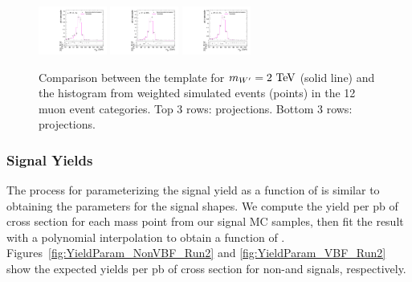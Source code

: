 \begin{figure}[htpb]
  \includegraphics[width=0.2\textwidth]{fig/2Dfit/templateVsReco_VBFWprToWZ2000_r0_MJ_mu_LP_vbf_LDy.pdf}
  \includegraphics[width=0.2\textwidth]{fig/2Dfit/templateVsReco_VBFWprToWZ2000_r0_MJ_mu_HP_vbf_HDy.pdf}
  \includegraphics[width=0.2\textwidth]{fig/2Dfit/templateVsReco_VBFWprToWZ2000_r0_MJ_mu_LP_vbf_HDy.pdf}\\
  \caption{
    Comparison between the \VBF\WprtoWZ template for $m_{\Wpr}=2\unit{TeV}$ (solid line) and the histogram from weighted simulated events (points) in the 12 muon event categories.
    Top 3 rows: \MVV projections.
    Bottom 3 rows: \MJ projections.
  }
  \label{fig:1dtemplateVsReco_VBFWprToWZ2000_Run2}
\end{figure}

\subsubsection{Signal Yields}

The process for parameterizing the signal yield as a function of \MX is similar to obtaining the parameters for the signal shapes.
We compute the yield per pb of cross section for each mass point from our signal MC samples, then fit the result with a polynomial interpolation to obtain a function of \MX.
Figures~\ref{fig:YieldParam_NonVBF_Run2} and \ref{fig:YieldParam_VBF_Run2} show the expected yields per pb of cross section for non-\VBF and \VBF signals, respectively.

